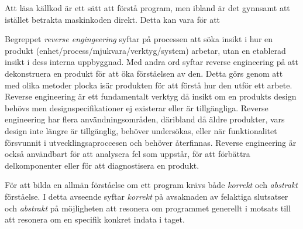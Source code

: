 Att läsa källkod är ett sätt att förstå program, men ibland är det gynnsamt att istället betrakta
maskinkoden direkt. Detta kan vara för att

Begreppet \textit{reverse engingeering} syftar på processen att söka insikt i hur en produkt 
(enhet/process/mjukvara/verktyg/system) arbetar, utan en etablerad insikt i dess interna 
uppbyggnad. Med andra ord syftar reverse engineering på att dekonstruera en produkt för att 
öka förståelsen av den. Detta görs genom att med olika metoder plocka isär produkten för 
att förstå hur den utför ett arbete. Reverse engineering är ett fundamentalt verktyg då insikt 
om en produkts design behövs men designspecifikationer ej existerar eller är tillgängliga. 
Reverse engineering har flera användningsområden, däribland då äldre produkter, vars design 
inte längre är tillgänglig, behöver undersökas, eller när funktionalitet försvunnit i 
utvecklingsaproccesen och behöver återfinnas. Reverse engineering är också användbart för 
att analysera fel som uppstår, för att förbättra delkomponenter eller för att diagnostisera 
en produkt.

För att bilda en allmän förståelse om ett program krävs både \textit{korrekt} och
\textit{abstrakt} förståelse. I detta avseende syftar \textit{korrekt} på
avsaknaden av felaktiga slutsatser och \textit{abstrakt} på möjligheten att
resonera om programmet generellt i motsats till att resonera om en specifik
konkret indata i taget.



